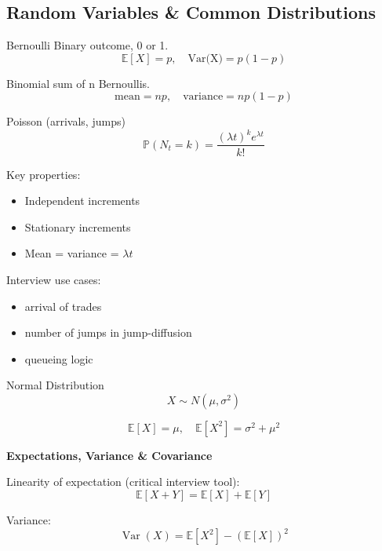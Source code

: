\documentclass{report}
\begin{document}
\subsection*{Random Variables \& Common Distributions}

Bernoulli
Binary outcome, 0 or 1.
\begin{equation}
    \mathbb{E}[X]=p, \quad \text{Var(X)}=p(1-p)
\end{equation}

Binomial
sum of n Bernoullis.
\begin{equation}
    \text{mean}=np, \quad \text{variance}=np(1-p)
\end{equation}

Poisson (arrivals, jumps)
\begin{equation}
    \mathbb{P}(N_t=k)=\frac{(\lambda t)^ke^{\lambda t}}{k!}
\end{equation}

Key properties:
\begin{itemize}
    \item Independent increments
    \item Stationary increments
    \item Mean = variance = $\lambda t$
\end{itemize}

Interview use cases:

\begin{itemize}
    \item arrival of trades
    \item number of jumps in jump-diffusion
    \item queueing logic
\end{itemize}

Normal Distribution
\begin{equation}
    X\sim N(\mu,\sigma^{2})
\end{equation}

\begin{equation}
    \mathbb{E}[X]=\mu, \quad \mathbb{E}[X^{2}]=\sigma^{2}+\mu^{2}
\end{equation}

\textbf{Expectations, Variance \& Covariance}

Linearity of expectation (critical interview tool):
\begin{equation}
    \mathbb{E}[X + Y] = \mathbb{E}[X] + \mathbb{E}[Y]
\end{equation}


Variance:
\begin{equation}
    \operatorname{Var}(X) = \mathbb{E}[X^2] - (\mathbb{E}[X])^2
\end{equation}
\end{document}
